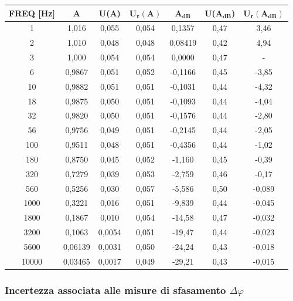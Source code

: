 \begin{table}[!ht]
    \centering
    \begin{tabular}{|c|c|c|c|c|c|c|}
    \hline

        \textbf{FREQ [Hz]} & \textbf{A} & \textbf{U(A)} & $\bm{U_r(A)}$ & $\bm{A_{dB}}$ & \textbf{U($\bm{A_{dB}}$)} & $\bm{U_r(A_{dB})}$ \\ \hline

        1 & 1,016 & 0,055 & 0,054 & 0,1357 & 0,47 & 3,46 \\ \hline
        2 & 1,010 & 0,048 & 0,048 & 0,08419 & 0,42 & 4,94 \\ \hline
        3 & 1,000 & 0,054 & 0,054 & 0,0000 & 0,47 & - \\ \hline
        6 & 0,9867 & 0,051 & 0,052 & -0,1166 & 0,45 & -3,85 \\ \hline
        10 & 0,9882 & 0,051 & 0,051 & -0,1031 & 0,44 & -4,32 \\ \hline
        18 & 0,9875 & 0,050 & 0,051 & -0,1093 & 0,44 & -4,04 \\ \hline
        32 & 0,9820 & 0,050 & 0,051 & -0,1576 & 0,44 & -2,80 \\ \hline
        56 & 0,9756 & 0,049 & 0,051 & -0,2145 & 0,44 & -2,05 \\ \hline
        100 & 0,9511 & 0,048 & 0,051 & -0,4356 & 0,44 & -1,02 \\ \hline
        180 & 0,8750 & 0,045 & 0,052 & -1,160 & 0,45 & -0,39 \\ \hline
        320 & 0,7279 & 0,039 & 0,053 & -2,759 & 0,46 & -0,17 \\ \hline
        560 & 0,5256 & 0,030 & 0,057 & -5,586 & 0,50 & -0,089 \\ \hline
        1000 & 0,3221 & 0,016 & 0,051 & -9,839 & 0,44 & -0,045 \\ \hline
        1800 & 0,1867 & 0,010 & 0,054 & -14,58 & 0,47 & -0,032 \\ \hline
        3200 & 0,1063 & 0,0054 & 0,051 & -19,47 & 0,44 & -0,023 \\ \hline
        5600 & 0,06139 & 0,0031 & 0,050 & -24,24 & 0,43 & -0,018 \\ \hline
        10000 & 0,03465 & 0,0017 & 0,049 & -29,21 & 0,43 & -0,015 \\ \hline
    \end{tabular}
\end{table}

\FloatBarrier
\clearpage


\subsubsection*{Incertezza associata alle misure di sfasamento $\Delta \varphi$}



